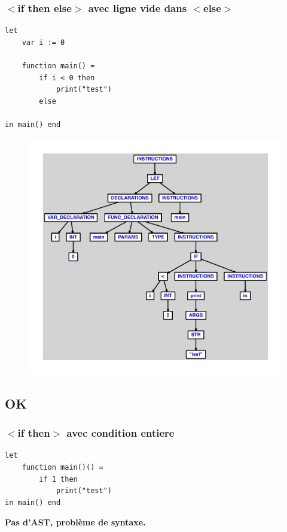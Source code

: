 \documentclass{article}
\begin{document}
\subsubsection{$ < $if then else$ > $ avec ligne vide dans $ < $else$ > $}
\begin{lstlisting}
let
	var i := 0

	function main() =
		if i < 0 then
			print("test")
		else

in main() end
\end{lstlisting}
\newpage
\begin{figure}[H]
\centering
\includegraphics[max width=\textwidth]{ast/ast_256.pdf}
\end{figure}
\newpage
\subsection{OK}
\subsubsection{$ < $if then$ > $ avec condition entiere}
\begin{lstlisting}
let
	function main()() =
		if 1 then
			print("test")
in main() end
\end{lstlisting}
\newpage
{\color{red}\textbf{Pas d'AST, problème de syntaxe.}}
\newpage
\end{document}
